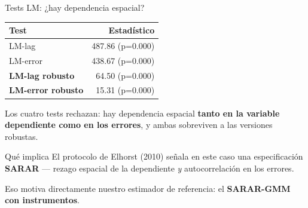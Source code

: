 \documentclass[
  10pt,
  ignorenonframetext,
  aspectratio=169,
  spanish,
]{beamer}
\begin{document}
\begin{frame}{Tests LM: ¿hay dependencia espacial?}
\protect{}\label{tests-lm-hay-dependencia-espacial}
\begin{table}[!h]
\centering\begingroup\fontsize{9}{11}\selectfont

\begin{tabular}[t]{lr}
\toprule
Test & Estadístico\\
\midrule
LM-lag & 487.86 (p=0.000)\\
LM-error & 438.67 (p=0.000)\\
\textbf{LM-lag robusto} & 64.50 (p=0.000)\\
\textbf{LM-error robusto} & 15.31 (p=0.000)\\
\bottomrule
\end{tabular}
\endgroup{}
\end{table}

\vspace{0.35cm}

Los cuatro tests rechazan: hay dependencia espacial \textbf{tanto en la
variable dependiente como en los errores}, y ambas sobreviven a las
versiones robustas.

\vspace{0.2cm}

\begin{block}{Qué implica}
El protocolo de Elhorst (2010) señala en este caso una especificación \textbf{SARAR} --- rezago espacial de la dependiente \emph{y} autocorrelación en los errores.

\vspace{0.15cm}

Eso motiva directamente nuestro estimador de referencia: el \textbf{SARAR-GMM con instrumentos}.
\end{block}
\end{frame}
\end{document}
